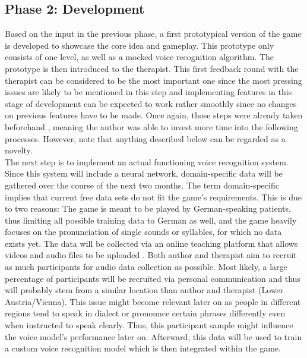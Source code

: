 \documentclass[draft,final]{vutinfth} %
\begin{document}
\subsection{Phase 2: Development}
Based on the input in the previous phase, a first prototypical version of the game is developed to showcase the core idea and gameplay. This prototype only consists of one level, as well as a mocked voice recognition algorithm. The prototype is then introduced to the therapist. This first feedback round with the therapist can be considered to be the most important one since the most pressing issues are likely to be mentioned in this step and implementing features in this stage of development can be expected to work rather smoothly since no changes on previous features have to be made. Once again, those steps were already taken beforehand \cite{LEPaper}, meaning the author was able to invest more time into the following processes. However, note that anything described below can be regarded as a novelty. \\
The next step is to implement an actual functioning voice recognition system. Since this system will include a neural network, domain-specific data will be gathered over the course of the next two months. The term domain-specific implies that current free data sets do not fit the game's requirements. This is due to two reasons: The game is meant to be played by German-speaking patients, thus limiting all possible training data to German as well, and the game heavily focuses on the pronunciation of single sounds or syllables, for which no data exists yet. The data will be collected via an online teaching platform that allows videos and audio files to be uploaded \cite{Flip}. Both author and therapist aim to recruit as much participants for audio data collection as possible. Most likely, a large percentage of participants will be recruited via personal communication and thus will probably stem from a similar location than author and therapist (Lower Austria/Vienna). This issue might become relevant later on as people in different regions tend to speak in dialect or pronounce certain phrases differently even when instructed to speak clearly. Thus, this participant sample might influence the voice model's performance later on. Afterward, this data will be used to train a custom voice recognition model which is then integrated within the game.
\end{document}
